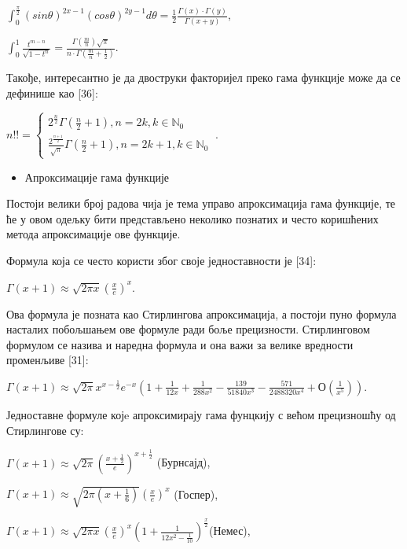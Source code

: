 \(\int_{0}^{\frac{\pi}{2}}{(sin\theta)}^{2x - 1}{(cos\theta)}^{2y - 1}d\theta = \frac{1}{2}\frac{\Gamma(x) \cdot \Gamma(y)}{\Gamma(x + y)}\),

\(\int_{0}^{1}\frac{t^{m - n}}{\sqrt{1 - t^{n}}} = \frac{\Gamma\left( \frac{m}{n} \right)\sqrt{\pi}}{n \cdot \Gamma\left( \frac{m}{n} + \frac{1}{2} \right)}\).

Такође, интересантно је да двоструки факторијел преко гама функције може
да се дефинише као {[}36{]}:

\(n!! = \left\{ \begin{array}{r}
2^{\frac{n}{2}}\Gamma(\frac{n}{2} + 1),n = 2k,k \in \mathbb{N}_{0} \\
\frac{2^{\frac{n + 1}{2}}}{\sqrt{\pi}}\Gamma(\frac{n}{2} + 1),n = 2k + 1,k \in \mathbb{N}_{0}
\end{array} \right.\ \).

\begin{itemize}
\item
  Апроксимације гама функције
\end{itemize}

Постоји велики број радова чија је тема управо апроксимација гама
функције, те ће у овом одељку бити представљено неколико познатих и
често коришћених метода апроксимације ове функције.

Формула која се често користи због своје једноставности је {[}34{]}:

\(\Gamma(x + 1) \approx \sqrt{2\pi x}\left( \frac{x}{e} \right)^{x}\).

Ова формула је позната као Стирлингова апроксимација, а постоји пуно
формула насталих побољшањем ове формуле ради боље прецизности.
Стирлинговом формулом се назива и наредна формула и она важи за велике
вредности променљиве {[}31{]}:

\(\Gamma(x + 1) \approx \sqrt{2\pi}x^{x - \frac{1}{2}}e^{- x}(1 + \frac{1}{12x} + \frac{1}{288x^{2}} - \frac{139}{51840x^{3}} - \frac{571}{2488320x^{4}} + О\left( \frac{1}{x^{5}} \right))\).

Једноставне формуле којe апроксимирају гама фунцкију с већом прецизношћу
од Стирлингове су:

\(\Gamma(x + 1) \approx \sqrt{2\pi}\left( \frac{x + \frac{1}{2}}{e} \right)^{x + \frac{1}{2}}\)
(Бурнсајд),

\(\Gamma(x + 1) \approx \sqrt{2\pi\left( x + \frac{1}{6} \right)}\left( \frac{x}{e} \right)^{x}\)
(Госпер),

\(\Gamma(x + 1) \approx \sqrt{2\pi x}\left( \frac{x}{e} \right)^{x}\left( 1 + \frac{1}{12x^{2} - \frac{1}{10}} \right)^{\frac{x}{2}}\)(Немес),

